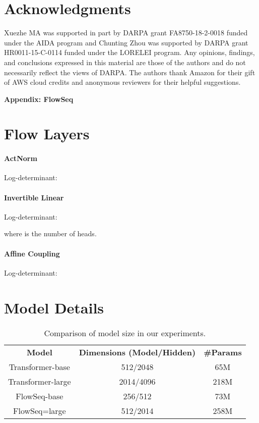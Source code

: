 \documentclass[11pt,a4paper]{article}
\begin{document}
\vspace{-1mm}
\section*{Acknowledgments}
Xuezhe MA was supported in part by DARPA grant FA8750-18-2-0018 funded under the AIDA
program and Chunting Zhou was supported by DARPA grant HR0011-15-C-0114 funded under the LORELEI program.
Any opinions, findings, and conclusions expressed in this material are those of the authors and do not necessarily reflect the views of DARPA.
The authors thank Amazon for their gift of AWS cloud credits and anonymous reviewers for their helpful suggestions.




\newpage
\appendix
\onecolumn
\begin{center}
  {\huge {\bf Appendix: FlowSeq}}  
\end{center}

\section{Flow Layers}\label{appendix:flow}
\paragraph{ActNorm}

Log-determinant:


\paragraph{Invertible Linear}

Log-determinant:

where  is the number of heads.

\paragraph{Affine Coupling}

Log-determinant:


\section{Model Details}
\label{appendix:model}
\begin{table}[!ht]
\centering
\begin{tabular}[t]{ccc}
\toprule
\textbf{Model} & \textbf{Dimensions (Model/Hidden)} & \textbf{\#Params} \\
Transformer-base & 512/2048 & 65M \\
Transformer-large & 2014/4096 & 218M \\
\midrule
FlowSeq-base & 256/512 & 73M \\
FlowSeq=large & 512/2014 & 258M \\
\bottomrule
\end{tabular}
\caption{Comparison of model size in our experiments.}
\label{tab:model_size}
\end{table}
\end{document}
